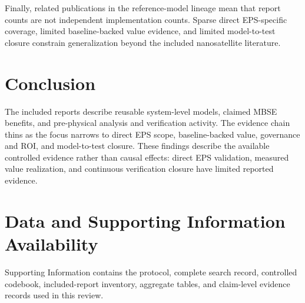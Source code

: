 \documentclass[alpha-refs]{wiley-article}
\begin{document}
Finally, related publications in the reference-model lineage mean that report counts are not independent implementation counts.  Sparse direct EPS-specific coverage, limited baseline-backed value evidence, and limited model-to-test closure constrain generalization beyond the included nanosatellite literature.

\section{Conclusion}

The included reports describe reusable system-level models, claimed MBSE benefits, and pre-physical analysis and verification activity.  The evidence chain thins as the focus narrows to direct EPS scope, baseline-backed value, governance and ROI, and model-to-test closure.  These findings describe the available controlled evidence rather than causal effects: direct EPS validation, measured value realization, and continuous verification closure have limited reported evidence.

\section*{Data and Supporting Information Availability}
Supporting Information contains the protocol, complete search record, controlled codebook, included-report inventory, aggregate tables, and claim-level evidence records used in this review.


\end{document}
